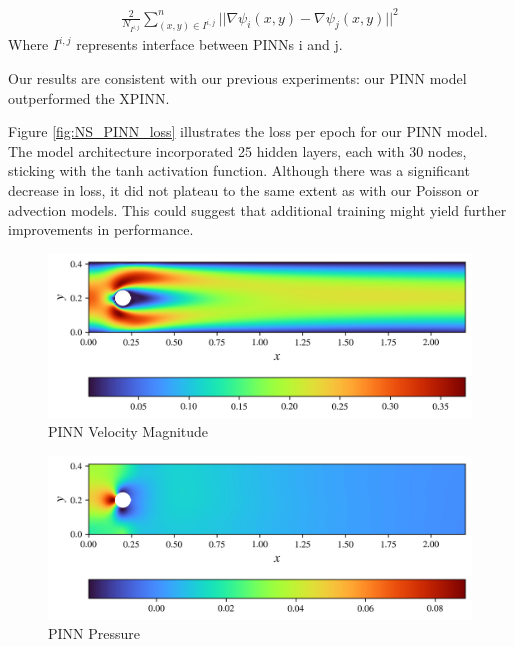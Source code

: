 \begin{align*}
    \frac{2}{N_{I^{i,j}}} \sum_{(x,y) \in {I^{i,j}}}^n || \nabla \psi_i(x,y)  - \nabla \psi_j(x,y)||^2
\end{align*}
Where $I^{i,j}$ represents interface between PINNs i and j.

Our results are consistent with our previous experiments: our PINN model outperformed the XPINN.

Figure \ref{fig:NS_PINN_loss} illustrates the loss per epoch for our PINN model. The model architecture incorporated 25 hidden layers, each with 30 nodes, sticking with the tanh activation function. Although there was a significant decrease in loss, it did not plateau to the same extent as with our Poisson or advection models. This could suggest that additional training might yield further improvements in performance.

\begin{figure}[h]
    \centering
    \includegraphics[width=\linewidth]{Project1XPINNs/figures/NavierStokes/NoDecomp/ND_10000_iter_30x25/solution/flow_magnitude_no_decomp.png}
    \caption{PINN Velocity Magnitude}
    \label{fig:NS_PINN_FlowMag}
\end{figure}


\begin{figure}[h]
    \centering
    \includegraphics[width=\linewidth]{Project1XPINNs/figures/NavierStokes/NoDecomp/ND_10000_iter_30x25/solution/pressure_no_decomp.png}
    \caption{PINN Pressure}
    \label{fig:NS_PINN_Pressure}
\end{figure}

